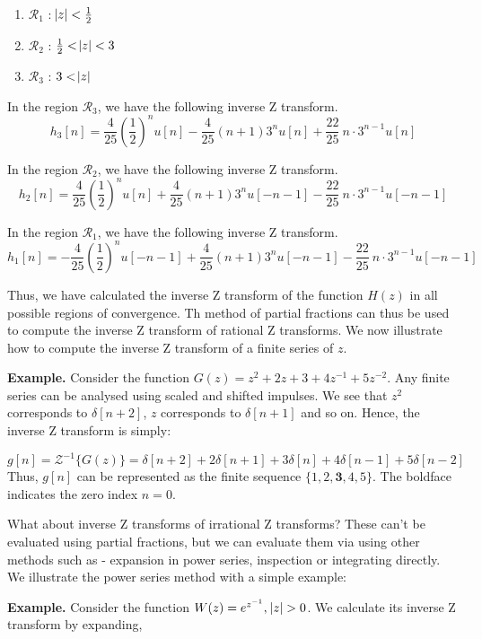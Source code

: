 \documentclass{article}
\theoremstyle{definition}
\begin{document}
\begin{enumerate}
\item $\mathcal{R}_1$ : $\abs{z} < \frac{1}{2}$
\item $\mathcal{R}_2$ : $\frac{1}{2} < \abs{z} < 3$
\item $\mathcal{R}_3$ : $3 < \abs{z}$
\end{enumerate}

In the region $\mathcal{R}_3$, we have the following inverse Z transform.
\[
h_3[n] = \boxed{\frac{4}{25} \left(\frac{1}{2}\right)^n u[n] - \frac{4}{25} (n+1) 3^n u[n] + \frac{22}{25} \: n \cdot 3^{n-1} u[n]}
\]

In the region $\mathcal{R}_2$, we have the following inverse Z transform.
\[
h_2[n] = \boxed{\frac{4}{25} \left(\frac{1}{2}\right)^n u[n] + \frac{4}{25} (n+1) 3^n u[-n-1] - \frac{22}{25} \: n \cdot 3^{n-1} u[-n-1]}
\]

In the region $\mathcal{R}_1$, we have the following inverse Z transform.
\[
h_1[n] = \boxed{-\frac{4}{25} \left(\frac{1}{2}\right)^n u[-n-1] + \frac{4}{25} (n+1) 3^n u[-n-1] - \frac{22}{25} \: n \cdot 3^{n-1} u[-n-1]}
\]

Thus, we have calculated the inverse Z transform of the function $H(z)$ in all possible regions of convergence. Th method of partial fractions can thus be used to compute the inverse Z transform of rational Z transforms. We now illustrate how to compute the inverse Z transform of a finite series of $z$. \smallskip

\textbf{Example.} Consider the function $G(z) = z^2 + 2z + 3 + 4z^{-1} + 5z^{-2}$. Any finite series can be analysed using scaled and shifted impulses. We see that $z^2$ corresponds to $\delta[n+2]$, $z$ corresponds to $\delta[n+1]$ and so on. Hence, the inverse Z transform is simply:

\[
	g[n] = \mathcal{Z}^{-1} \{ G(z) \} = \delta[n+2] + 2\delta[n+1] + 3\delta[n] + 4\delta[n-1] + 5\delta[n-2]
\]
Thus, $g[n]$ can be represented as the finite sequence $\{ 1,2,\textbf{3},4,5 \}$. The boldface indicates the zero index $n=0$. \smallskip

What about inverse Z transforms of irrational Z transforms? These can't be evaluated using partial fractions, but we can evaluate them via using other methods such as - expansion in power series, inspection or integrating directly. We illustrate the power series method with a simple example: \smallskip

\textbf{Example.} Consider the function $W(z) = e^{z^{-1}}, \: \abs{z} > 0$. We calculate its inverse Z transform by expanding,
\end{document}
